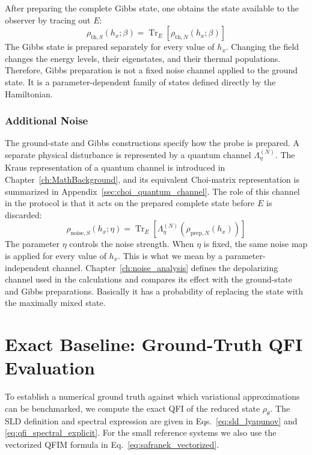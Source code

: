 After preparing the complete Gibbs state, one obtains the state available to the observer by tracing out $E$:
\begin{equation}
    \rho_{\mathrm{th},S}(h_x;\beta)
    =\operatorname{Tr}_E[\rho_{\mathrm{th},N}(h_x;\beta)]
\end{equation}
The Gibbs state is prepared separately for every value of $h_x$. Changing the field changes the energy levels, their eigenstates, and their thermal populations. Therefore, Gibbs preparation is not a fixed noise channel applied to the ground state. It is a parameter-dependent family of states defined directly by the Hamiltonian.

\subsubsection{Additional Noise}
The ground-state and Gibbs constructions specify how the probe is prepared. A separate physical disturbance is represented by a quantum channel $\Lambda_\eta^{(N)}$. The Kraus representation of a quantum channel is introduced in Chapter~\ref{ch:MathBackground}, and its equivalent Choi-matrix representation is summarized in Appendix~\ref{sec:choi_quantum_channel}. The role of this channel in the protocol is that it acts on the prepared complete state before $E$ is discarded:
\begin{equation}
    \rho_{\mathrm{noise},S}(h_x;\eta)
    =\operatorname{Tr}_E\!\left[
        \Lambda_\eta^{(N)}\!\left(\rho_{\mathrm{prep},N}(h_x)\right)
        \right]
    \label{eq:methods_generic_noise_channel}
\end{equation}
The parameter $\eta$ controls the noise strength. When $\eta$ is fixed, the same noise map is applied for every value of $h_x$. This is what we mean by a parameter-independent channel. Chapter~\ref{ch:noise_analysis} defines the depolarizing channel used in the calculations and compares its effect with the ground-state and Gibbs preparations. Basically it has a probability of replacing the state with the maximally mixed state.


\section{Exact Baseline: Ground-Truth QFI Evaluation}

To establish a numerical ground truth against which variational approximations can be benchmarked, we compute the exact QFI of the reduced state $\rho_\theta$. The SLD definition and spectral expression are given in Eqs.~\eqref{eq:sld_lyapunov} and \eqref{eq:qfi_spectral_explicit}.
For the small reference systems we also use the vectorized QFIM formula in Eq.~\eqref{eq:safranek_vectorized}.


